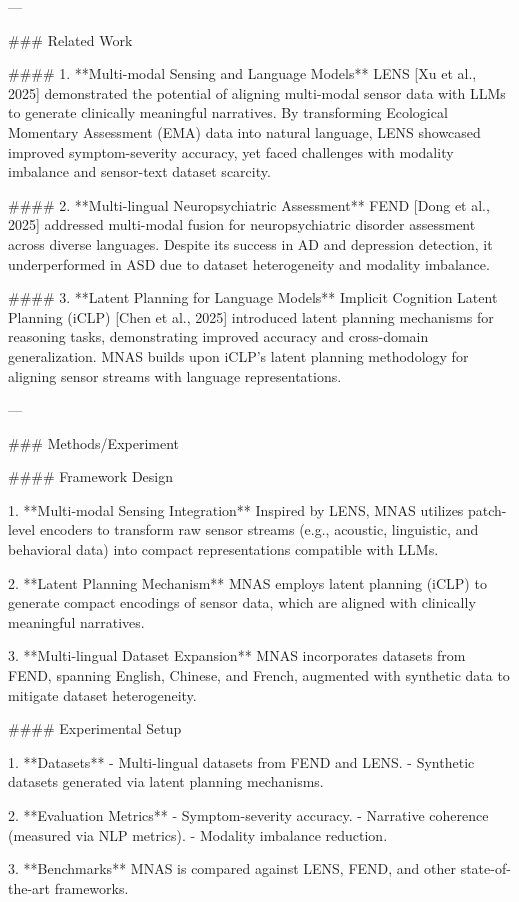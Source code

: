 ---

### Related Work

#### 1. **Multi-modal Sensing and Language Models**
LENS [Xu et al., 2025] demonstrated the potential of aligning multi-modal sensor data with LLMs to generate clinically meaningful narratives. By transforming Ecological Momentary Assessment (EMA) data into natural language, LENS showcased improved symptom-severity accuracy, yet faced challenges with modality imbalance and sensor-text dataset scarcity.

#### 2. **Multi-lingual Neuropsychiatric Assessment**
FEND [Dong et al., 2025] addressed multi-modal fusion for neuropsychiatric disorder assessment across diverse languages. Despite its success in AD and depression detection, it underperformed in ASD due to dataset heterogeneity and modality imbalance.

#### 3. **Latent Planning for Language Models**
Implicit Cognition Latent Planning (iCLP) [Chen et al., 2025] introduced latent planning mechanisms for reasoning tasks, demonstrating improved accuracy and cross-domain generalization. MNAS builds upon iCLP’s latent planning methodology for aligning sensor streams with language representations.

---

### Methods/Experiment

#### Framework Design

1. **Multi-modal Sensing Integration**  
   Inspired by LENS, MNAS utilizes patch-level encoders to transform raw sensor streams (e.g., acoustic, linguistic, and behavioral data) into compact representations compatible with LLMs.

2. **Latent Planning Mechanism**  
   MNAS employs latent planning (iCLP) to generate compact encodings of sensor data, which are aligned with clinically meaningful narratives.

3. **Multi-lingual Dataset Expansion**  
   MNAS incorporates datasets from FEND, spanning English, Chinese, and French, augmented with synthetic data to mitigate dataset heterogeneity.

#### Experimental Setup

1. **Datasets**  
   - Multi-lingual datasets from FEND and LENS.
   - Synthetic datasets generated via latent planning mechanisms.

2. **Evaluation Metrics**  
   - Symptom-severity accuracy.
   - Narrative coherence (measured via NLP metrics).
   - Modality imbalance reduction.

3. **Benchmarks**  
   MNAS is compared against LENS, FEND, and other state-of-the-art frameworks.

